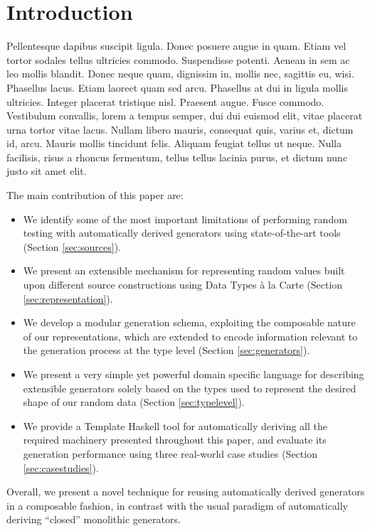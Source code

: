 \section{Introduction}
\label{sec:intro}

Pellentesque dapibus suscipit ligula. Donec posuere augue in quam. Etiam vel
tortor sodales tellus ultricies commodo. Suspendisse potenti. Aenean in sem ac
leo mollis blandit. Donec neque quam, dignissim in, mollis nec, sagittis eu,
wisi. Phasellus lacus. Etiam laoreet quam sed arcu. Phasellus at dui in ligula
mollis ultricies. Integer placerat tristique nisl. Praesent augue. Fusce
commodo. Vestibulum convallis, lorem a tempus semper, dui dui euismod elit,
vitae placerat urna tortor vitae lacus. Nullam libero mauris, consequat quis,
varius et, dictum id, arcu. Mauris mollis tincidunt felis. Aliquam feugiat
tellus ut neque. Nulla facilisis, risus a rhoncus fermentum, tellus tellus
lacinia purus, et dictum nunc justo sit amet elit.




The main contribution of this paper are:
%
\begin{itemize}
\item We identify some of the most important limitations of performing random
  testing with automatically derived generators using state-of-the-art tools
  (Section \ref{sec:sources}).
\item We present an extensible mechanism for representing random values built
  upon different source constructions using Data Types \`a la Carte (Section
  \ref{sec:representation}).
\item We develop a modular generation schema, exploiting the composable nature
  of our representations, which are extended to encode information relevant to
  the generation process at the type level (Section \ref{sec:generators}).
\item We present a very simple yet powerful domain specific language for
  describing extensible generators solely based on the types used to represent
  the desired shape of our random data (Section \ref{sec:typelevel}).
\item We provide a Template Haskell tool for automatically deriving all the
  required machinery presented throughout this paper, and evaluate its
  generation performance using three real-world case studies (Section
  \ref{sec:casestudies}).
\end{itemize}

Overall, we present a novel technique for reusing automatically derived
generators in a composable fashion, in contrast with the usual paradigm of
automatically deriving ``closed'' monolithic generators.